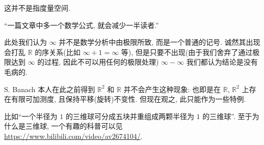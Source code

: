 \begin{alterendnote}
    这并不是指度量空间.
\end{alterendnote}
\begin{alterendnote}
    ``一篇文章中多一个数学公式, 就会减少一半读者.''
\end{alterendnote}
\begin{alterendnote}
    此处我们认为 $\infty$ 并不是数学分析中由极限所致, 而是一个普通的记号. 诚然其出现会打乱 $\mathbb R$ 的序关系(比如 $\infty +1=\infty$ 等), 但是只要不出现(由于我们舍弃了通过极限达到 $\infty$ 的过程, 因此不可以用任何的极限处理) $\infty-\infty$ 我们都认为结论是没有毛病的.
\end{alterendnote}
\begin{alterendnote}
    S. Banach 本人在此之前得到 $\mathbb R^2$ 和 $\mathbb R$ 并不会产生这种现象: 也即是在 $\mathbb R$, $\mathbb R^2$ 上存在有限可加测度, 且保持平移(旋转)不变性. 但现在观之, 此只能作为一些特例.
\end{alterendnote}
\begin{alterendnote}
    比如``一个半径为 $1$ 的三维球可分成五块并重组成两颗半径为 $1$ 的三维球''. 至于为什么是三维球, 一个有趣的科普可以见 \url{https://www.bilibili.com/video/av2674104/}.
\end{alterendnote}
